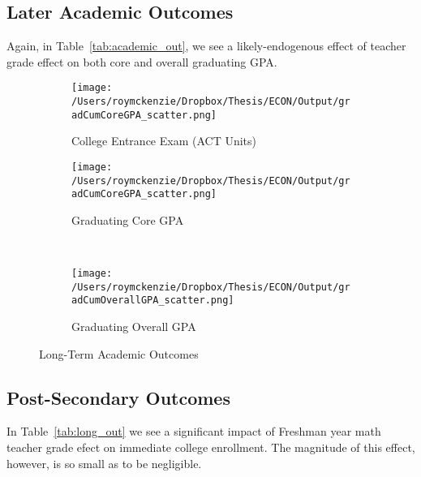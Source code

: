\documentclass[../thesis_main.tex]{subfiles}
\begin{document}
\subsection*{Later Academic Outcomes}

Again, in Table~\ref{tab:academic_out}, we see a likely-endogenous effect of teacher grade effect on both core and overall graduating GPA. 



\begin{figure}
     \centering
     \begin{subfigure}[b]{0.4\textwidth}
         \centering
         \texttt{[image: /Users/roymckenzie/Dropbox/Thesis/ECON/Output/gradCumCoreGPA\_scatter.png]}
         \caption{College Entrance Exam (ACT Units)}
         \label{fig:highACT_EQUIV}
     \end{subfigure}
     \hfill
     \begin{subfigure}[b]{0.4\textwidth}
         \centering
         \texttt{[image: /Users/roymckenzie/Dropbox/Thesis/ECON/Output/gradCumCoreGPA\_scatter.png]}
         \caption{Graduating Core GPA}
         \label{fig:gradCumCoreGPA}
     \end{subfigure}\\

     \begin{subfigure}[b]{0.4\textwidth}
         \centering
         \texttt{[image: /Users/roymckenzie/Dropbox/Thesis/ECON/Output/gradCumOverallGPA\_scatter.png]}
         \caption{Graduating Overall GPA}
         \label{fig:gradCumOverallGPA}
     \end{subfigure}
    \caption{Long-Term Academic Outcomes}
    \label{fig:academic}
\end{figure}

\subsection*{Post-Secondary Outcomes}

In Table~\ref{tab:long_out} we see a significant impact of Freshman year math teacher grade efect on immediate college enrollment. The magnitude of this effect, however, is so small as to be negligible. 


\end{document}
